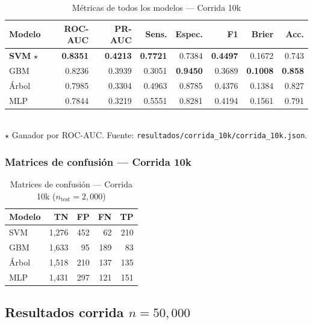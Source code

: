 \documentclass[12pt,a4paper]{article}
\begin{document}
\begin{table}[H]
  \centering
  \caption{Métricas de todos los modelos — Corrida 10k}
  \label{tab:corrida10k}
  \begin{tabular}{lrrrrrrr}
    \toprule
    \textbf{Modelo} & \textbf{ROC-AUC} & \textbf{PR-AUC} & \textbf{Sens.} & \textbf{Espec.} & \textbf{F1} & \textbf{Brier} & \textbf{Acc.}\\
    \midrule
    \textbf{SVM} $\star$ & \textbf{0.8351} & \textbf{0.4213} & \textbf{0.7721} & 0.7384 & \textbf{0.4497} & 0.1672 & 0.743\\
    GBM & 0.8236 & 0.3939 & 0.3051 & \textbf{0.9450} & 0.3689 & \textbf{0.1008} & \textbf{0.858}\\
    Árbol & 0.7985 & 0.3304 & 0.4963 & 0.8785 & 0.4376 & 0.1384 & 0.827\\
    MLP & 0.7844 & 0.3219 & 0.5551 & 0.8281 & 0.4194 & 0.1561 & 0.791\\
    \bottomrule
  \end{tabular}
  \smallskip\\
  \footnotesize $\star$ Ganador por ROC-AUC. Fuente: \texttt{resultados/corrida\_10k/corrida\_10k.json}.
\end{table}

\subsubsection{Matrices de confusión — Corrida 10k}

\begin{table}[H]
  \centering
  \caption{Matrices de confusión — Corrida 10k ($n_{\text{test}}=2{,}000$)}
  \label{tab:cm10k}
  \begin{tabular}{lrrrr}
    \toprule
    \textbf{Modelo} & \textbf{TN} & \textbf{FP} & \textbf{FN} & \textbf{TP}\\
    \midrule
    SVM & 1{,}276 & 452 & 62 & 210\\
    GBM & 1{,}633 & 95 & 189 & 83\\
    Árbol & 1{,}518 & 210 & 137 & 135\\
    MLP & 1{,}431 & 297 & 121 & 151\\
    \bottomrule
  \end{tabular}
\end{table}

\subsection{Resultados corrida $n=50{,}000$}
\end{document}
